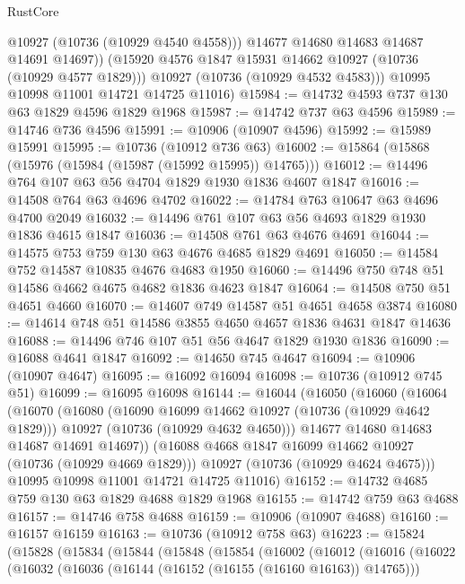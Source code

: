 \begin{lexlean}{RustCore}
\begin{coremodule}
              @10927
              (@10736 (@10929 @4540 @4558)))
            @14677
            @14680
            @14683
            @14687
            @14691
            @14697))
        (@15920 @4576 @1847 @15931 @14662 @10927 (@10736 (@10929 @4577 @1829)))
        @10927
        (@10736 (@10929 @4532 @4583)))
      @10995
      @10998
      @11001
      @14721
      @14725
      @11016)
@15984 := @14732 @4593 @737 @130 @63 @1829 @4596 @1829 @1968
@15987 := @14742 @737 @63 @4596
@15989 := @14746 @736 @4596
@15991 := @10906 (@10907 @4596)
@15992 := @15989 @15991
@15995 := @10736 (@10912 @736 @63)
@16002 := @15864 (@15868 (@15976 (@15984 (@15987 (@15992 @15995)) @14765)))
@16012 := @14496 @764 @107 @63 @56 @4704 @1829 @1930 @1836 @4607 @1847
@16016 := @14508 @764 @63 @4696 @4702
@16022 := @14784 @763 @10647 @63 @4696 @4700 @2049
@16032 := @14496 @761 @107 @63 @56 @4693 @1829 @1930 @1836 @4615 @1847
@16036 := @14508 @761 @63 @4676 @4691
@16044 := @14575 @753 @759 @130 @63 @4676 @4685 @1829 @4691
@16050 := @14584 @752 @14587 @10835 @4676 @4683 @1950
@16060 := @14496 @750 @748 @51 @14586 @4662 @4675 @4682 @1836 @4623 @1847
@16064 := @14508 @750 @51 @4651 @4660
@16070 := @14607 @749 @14587 @51 @4651 @4658 @3874
@16080 := @14614 @748 @51 @14586 @3855 @4650 @4657 @1836 @4631 @1847 @14636
@16088 := @14496 @746 @107 @51 @56 @4647 @1829 @1930 @1836
@16090 := @16088 @4641 @1847
@16092 := @14650 @745 @4647
@16094 := @10906 (@10907 @4647)
@16095 := @16092 @16094
@16098 := @10736 (@10912 @745 @51)
@16099 := @16095 @16098
@16144 := @16044
    (@16050
      (@16060
        (@16064
          (@16070
            (@16080
              (@16090 @16099 @14662 @10927 (@10736 (@10929 @4642 @1829)))
              @10927
              (@10736 (@10929 @4632 @4650)))
            @14677
            @14680
            @14683
            @14687
            @14691
            @14697))
        (@16088 @4668 @1847 @16099 @14662 @10927 (@10736 (@10929 @4669 @1829)))
        @10927
        (@10736 (@10929 @4624 @4675)))
      @10995
      @10998
      @11001
      @14721
      @14725
      @11016)
@16152 := @14732 @4685 @759 @130 @63 @1829 @4688 @1829 @1968
@16155 := @14742 @759 @63 @4688
@16157 := @14746 @758 @4688
@16159 := @10906 (@10907 @4688)
@16160 := @16157 @16159
@16163 := @10736 (@10912 @758 @63)
@16223 := @15824
    (@15828
      (@15834
        (@15844
          (@15848
            (@15854
              (@16002
                (@16012
                  (@16016
                    (@16022
                      (@16032
                        (@16036 (@16144 (@16152 (@16155 (@16160 @16163)) @14765)))

\end{coremodule}
\end{lexlean}
